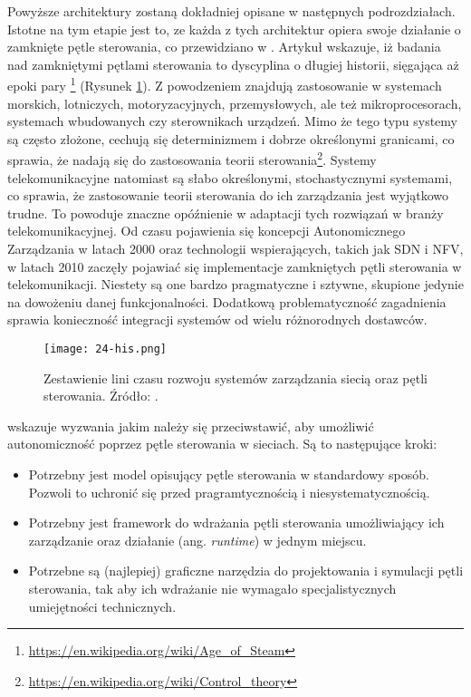 Powyższe architektury zostaną dokładniej opisane w następnych podrozdziałach. Istotne na tym etapie jest to, ze każda z tych architektur opiera swoje działanie o zamknięte pętle sterowania, co przewidziano w \cite{fallon2019}. Artykuł wskazuje, iż badania nad zamkniętymi pętlami sterowania to dyscyplina o długiej historii, sięgająca aż epoki pary \footnote{\url{https://en.wikipedia.org/wiki/Age_of_Steam}} (Rysunek \ref{fig:24-his}). Z powodzeniem znajdują zastosowanie w systemach morskich, lotniczych, motoryzacyjnych, przemysłowych, ale też mikroprocesorach, systemach wbudowanych czy sterownikach urządzeń. Mimo że tego typu systemy są często złożone, cechują się determinizmem i dobrze określonymi granicami, co sprawia, że nadają się do zastosowania teorii sterowania\footnote{\url{https://en.wikipedia.org/wiki/Control_theory}}. Systemy telekomunikacyjne natomiast są słabo określonymi, stochastycznymi systemami, co sprawia, że zastosowanie teorii sterowania do ich zarządzania jest wyjątkowo trudne. To powoduje znaczne opóźnienie w adaptacji tych rozwiązań w branży telekomunikacyjnej. Od czasu pojawienia się koncepcji Autonomicznego Zarządzania \cite{kephart2003} w latach 2000 oraz technologii wspierających, takich jak SDN i NFV, w latach 2010 zaczęły pojawiać się implementacje zamkniętych pętli sterowania w telekomunikacji. Niestety są one bardzo pragmatyczne i sztywne, skupione jedynie na dowożeniu danej funkcjonalności. Dodatkową problematyczność zagadnienia sprawia konieczność integracji systemów od wielu różnorodnych dostawców.

\begin{figure}[!htbp]
    \centering \texttt{[image: 24-his.png]}
    \caption{Zestawienie lini czasu rozwoju systemów zarządzania siecią oraz pętli sterowania. Źródło: \cite{fallon2019}.}\label{fig:24-his}
\end{figure}

\cite{fallon2019} wskazuje wyzwania jakim należy się przeciwstawić, aby umożliwić autonomiczność poprzez pętle sterowania w sieciach. Są to następujące kroki:
\begin{itemize}\hypertarget{list:1}{}
    \item Potrzebny jest model opisujący pętle sterowania w standardowy sposób. Pozwoli to uchronić się przed pragramtycznością i niesystematycznością.
    \item Potrzebny jest framework do wdrażania pętli sterowania umożliwiający ich zarządzanie oraz działanie (ang. \textit{runtime}) w jednym miejscu.
    \item Potrzebne są (najlepiej) graficzne narzędzia do projektowania i symulacji pętli sterowania, tak aby ich wdrażanie nie wymagało specjalistycznych umiejętności technicznych.
\end{itemize}


